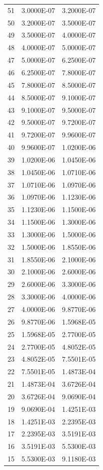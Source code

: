 \begin{appendices}
{\begin{longtable}[h!]{c r r}
51 & 3.0000E-07 & 3.2000E-07 \\
50 & 3.2000E-07 & 3.5000E-07 \\
49 & 3.5000E-07 & 4.0000E-07 \\
48 & 4.0000E-07 & 5.0000E-07 \\
47 & 5.0000E-07 & 6.2500E-07 \\
46 & 6.2500E-07 & 7.8000E-07 \\
45 & 7.8000E-07 & 8.5000E-07 \\
44 & 8.5000E-07 & 9.1000E-07 \\
43 & 9.1000E-07 & 9.5000E-07 \\
42 & 9.5000E-07 & 9.7200E-07 \\
41 & 9.7200E-07 & 9.9600E-07 \\
40 & 9.9600E-07 & 1.0200E-06 \\
39 & 1.0200E-06 & 1.0450E-06 \\
38 & 1.0450E-06 & 1.0710E-06 \\
37 & 1.0710E-06 & 1.0970E-06 \\
36 & 1.0970E-06 & 1.1230E-06 \\
35 & 1.1230E-06 & 1.1500E-06 \\
34 & 1.1500E-06 & 1.3000E-06 \\
33 & 1.3000E-06 & 1.5000E-06 \\
32 & 1.5000E-06 & 1.8550E-06 \\
31 & 1.8550E-06 & 2.1000E-06 \\
30 & 2.1000E-06 & 2.6000E-06 \\
29 & 2.6000E-06 & 3.3000E-06 \\
28 & 3.3000E-06 & 4.0000E-06 \\
27 & 4.0000E-06 & 9.8770E-06 \\
26 & 9.8770E-06 & 1.5968E-05 \\
25 & 1.5968E-05 & 2.7700E-05 \\
24 & 2.7700E-05 & 4.8052E-05 \\
23 & 4.8052E-05 & 7.5501E-05 \\
22 & 7.5501E-05 & 1.4873E-04 \\
21 & 1.4873E-04 & 3.6726E-04 \\
20 & 3.6726E-04 & 9.0690E-04 \\
19 & 9.0690E-04 & 1.4251E-03 \\
18 & 1.4251E-03 & 2.2395E-03 \\
17 & 2.2395E-03 & 3.5191E-03 \\
16 & 3.5191E-03 & 5.5300E-03 \\
15 & 5.5300E-03 & 9.1180E-03 \\

\end{longtable}}
\end{appendices}
